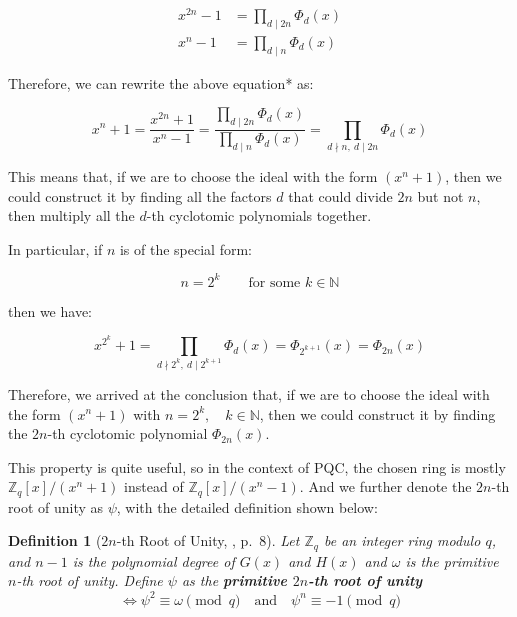 \documentclass[12pt]{article}
\newtheorem{definition}{Definition}[section]
\begin{document}
\begin{align*}
    x^{2n} - 1 &= \prod_{d \mid 2n} \Phi_d(x) \\
    x^n - 1 &= \prod_{d \mid n} \Phi_d(x) 
\end{align*}

Therefore, we can rewrite the above equation* as:

\begin{equation*}
    x^n + 1 
    = \frac{x^{2n} + 1}{x^n - 1} 
    = \frac{\prod_{d \mid 2n} \Phi_d(x)}{\prod_{d \mid n} \Phi_d(x)}
    = \prod_{d \nmid n, \ d \mid 2n} \Phi_d(x)
\end{equation*}

This means that, if we are to choose the ideal with the form $(x^n + 1)$, 
then we could construct it by finding all the factors $d$ that could divide $2n$ but not $n$, 
then multiply all the $d$-th cyclotomic polynomials together.

In particular, if $n$ is of the special form:

\begin{equation*}
    n = 2^k \qquad \text{for some } k \in \mathbb{N}
\end{equation*}

then we have:

\begin{equation*}
    x^{2^k} + 1 
    = \prod_{d \nmid 2^k, \ d \mid 2^{k+1}} \Phi_d(x)
    = \Phi_{2^{k+1}}(x)
    = \Phi_{2n}(x)
\end{equation*}

Therefore, we arrived at the conclusion that, 
if we are to choose the ideal with the form $(x^n + 1)$ with $n = 2^k, \quad k \in \mathbb{N}$, 
then we could construct it by finding the $2n$-th cyclotomic polynomial $\Phi_{2n}(x)$.

This property is quite useful, so in the context of PQC, 
the chosen ring is mostly $\mathbb{Z}_q[x] / (x^n + 1)$ instead of $\mathbb{Z}_q[x] / (x^n - 1)$.
\cite[p.~8]{beginner_guide} 
And we further denote the $2n$-th root of unity as $\psi$, 
with the detailed definition shown below:

\begin{definition}[$2n$-th Root of Unity, \cite{beginner_guide}, p.~8]
    Let $\mathbb{Z}_q$ be an integer ring modulo $q$, and $n - 1$ is the polynomial degree of $G(x)$ and $H(x)$
    and $\omega$ is the primitive $n$-th root of unity. 
    Define $\psi$ as the \textbf{primitive $2n$-th root of unity} 
    \begin{equation*}
        \iff \psi^2 \equiv \omega \pmod{q} \quad \text{and} \quad \psi^n \equiv -1 \pmod{q}
    \end{equation*}
\end{definition}
\end{document}
